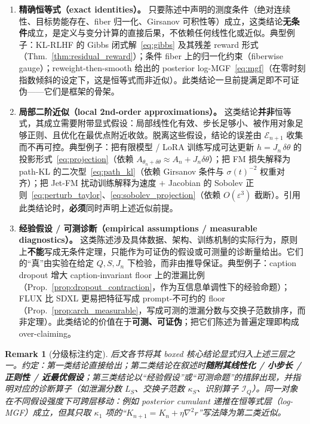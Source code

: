 \documentclass[11pt,a4paper]{article}
\newtheorem{remark}[theorem]{Remark}
\newcommand{\cE}{\mathcal{E}}
\newcommand{\cI}{\mathcal{I}}
\begin{document}
\begin{enumerate}[label=\textbf{第\arabic*类},leftmargin=*]

\item \textbf{精确恒等式（exact identities）。}
只要陈述中声明的测度条件（绝对连续性、目标势能存在、fiber 归一化、Girsanov 可积性等）成立，这类结论\textbf{无条件}成立，是定义与变分计算的直接后果，不依赖任何线性化或近似。典型例子：KL-RLHF 的 Gibbs 闭式解~\eqref{eq:gibbs} 及其残差 reward 形式（Thm.~\ref{thm:residual_reward}）；条件 fiber 上的归一化约束（fiberwise gauge）；reweight-then-smooth 给出的 posterior log-MGF~\eqref{eq:mgf}（在零时刻指数倾斜的设定下，这是恒等式而非近似）。此类结论一旦前提满足即不可证伪——它们是框架的骨架。

\item \textbf{局部二阶近似（local 2nd-order approximations）。}
这类结论\textbf{并非}恒等式，其成立需要附带显式假设：局部线性化有效、步长足够小、被作用对象足够正则、且优化在最优点附近收敛。脱离这些假设，结论的误差由 $\cE_{n+1}$ 收集而不再可控。典型例子：把有限模型 / LoRA 训练写成可达更新 $h=J_n\,\delta\theta$ 的投影形式~\eqref{eq:projection}（依赖 $A_{\theta_n+\delta\theta}\approx A_n+J_n\delta\theta$）；把 FM 损失解释为 path-KL 的二次型~\eqref{eq:path_kl}（依赖 Girsanov 条件与 $\sigma(t)^{-2}$ 权重对齐）；把 Jet-FM 扰动训练解释为速度 $+$ Jacobian 的 Sobolev 正则~\eqref{eq:perturb_taylor}、\eqref{eq:sobolev_projection}（依赖 $O(\varepsilon^3)$ 截断）。引用此类结论时，\textbf{必须}同时声明上述近似前提。

\item \textbf{经验假设 / 可测诊断（empirical assumptions / measurable diagnostics）。}
这类陈述涉及具体数据、架构、训练机制的实际行为，原则上\textbf{不能}写成无条件定理，只能作为可证伪的假设或可测量的诊断量给出。它们的“真”由实验在给定 $Q,S,J_n$ 下检验，而非由推导保证。典型例子：caption dropout 增大 caption-invariant floor 上的泄漏比例（Prop.~\ref{prop:dropout_contraction}，作为互信息单调性下的经验命题）；FLUX 比 SDXL 更易把特征写成 prompt-不可约的 floor（Prop.~\ref{prop:arch_measurable}，写成可测的泄漏分数与交换子范数排序，而非定理）。此类结论的价值在于\textbf{可测、可证伪}；把它们陈述为普遍定理即构成 over-claiming。

\end{enumerate}

\begin{remark}[分级标注约定]
后文各节将其 boxed 核心结论显式归入上述三层之一。约定：第一类结论直接给出；第二类结论在叙述时\textbf{随附其线性化 / 小步长 / 正则性 / 近最优假设}；第三类结论以“经验假设”或“可测命题”的措辞出现，并指明对应的诊断算子（如泄漏分数 $L_S$、交换子范数 $\kappa_S$、识别算子 $\cI_Q$）。同一对象在不同假设强度下可跨层移动：例如 posterior cumulant 递推在恒等式层（log-MGF）成立，但其只取 $\kappa_1$ 项的“$K_{n+1}=K_n+\eta\nabla^2 r$”写法降为第二类近似。
\end{remark}
\end{document}
